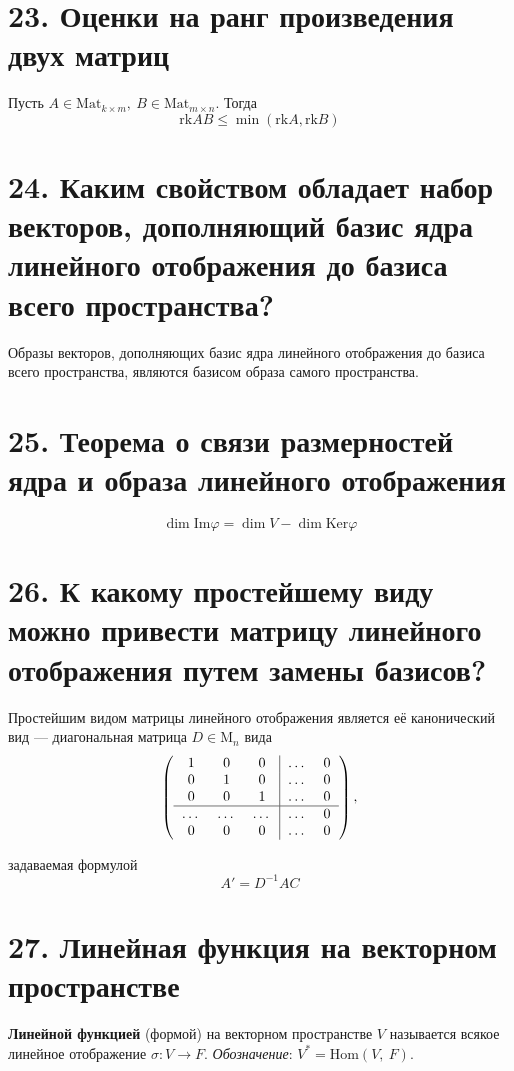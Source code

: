 \documentclass[a4paper, 12pt]{article}
\begin{document}
\section*{23. Оценки на ранг произведения двух матриц}
Пусть $A \in \text{Mat}_{k \times m},\ B \in \text{Mat}_{m \times n}$. Тогда
\[
\text{rk}AB \leqslant \min(\text{rk}A, \text{rk}B)
\]

\section*{24. Каким свойством обладает набор векторов, дополняющий базис ядра линейного отображения до базиса всего пространства?}
Образы векторов, дополняющих базис ядра линейного отображения до базиса всего пространства, являются базисом образа самого пространства.

\section*{25. Теорема о связи размерностей ядра и образа линейного отображения}
\vspace{-5mm}
\[
\dim \text{Im}\varphi = \dim V - \dim \text{Ker}\varphi
\]

\section*{26. К какому простейшему виду можно привести матрицу линейного отображения путем замены базисов?}
Простейшим видом матрицы линейного отображения является её канонический вид --- диагональная матрица $D \in \text{M}_n$ вида
\[\left(
\begin{tabular}{ccc|cl}
1 & 0 & 0 & \ldots & 0 \\
0 & 1 & 0 & \ldots & 0 \\
0 & 0 & 1 & \ldots & 0 \\ \hline
\ldots & \ldots & \ldots & \ldots & 0 \\
0 & 0 & 0 & \ldots & 0
\end{tabular}
\right),\]

задаваемая формулой \[A' = D^{-1}AC\]

\section*{27. Линейная функция на векторном пространстве}
\textbf{Линейной функцией} (формой) на векторном пространстве $V$ называется всякое линейное отображение $\sigma: V \rightarrow F$. \textit{Обозначение}: $V^* = \text{Hom}(V,\ F)$.
\end{document}

